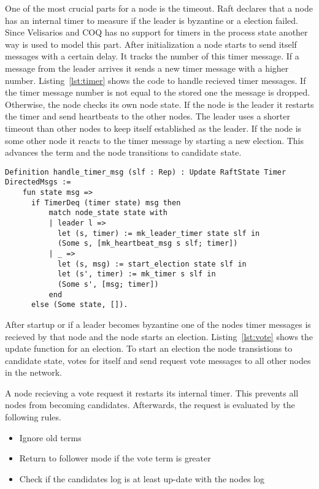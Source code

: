 One of the most crucial parts for a node is the timeout.
Raft declares that a node has an internal timer to measure
if the leader is byzantine or a election failed. 
Since Velisarios and COQ has no support
for timers in the process state another way is used to model this part.
After initialization a node starts to send itself messages with a
certain delay. It tracks the number of this timer message.
If a message from the leader arrives it sends a new timer
message with a higher number. Listing~\ref{lst:timer} shows
the code to handle recieved timer messages. If the timer message
number is not equal to the stored one the message is dropped.
Otherwise, the node checks its own node state.
If the node is the leader it restarts the timer and send heartbeats
to the other nodes. The leader uses a shorter timeout than other nodes
to keep itself established as the leader.
If the node is some other node it reacts to the timer message by
starting a new election. This advances the term and the node 
transitions to candidate state.

\begin{lstlisting}[style=coq,label=lst:timer,
caption=The implementation of handling timer messages.]
  Definition handle_timer_msg (slf : Rep) : Update RaftState Timer DirectedMsgs :=
    fun state msg =>
      if TimerDeq (timer state) msg then
          match node_state state with
          | leader l =>
            let (s, timer) := mk_leader_timer state slf in
            (Some s, [mk_heartbeat_msg s slf; timer])
          | _ =>
            let (s, msg) := start_election state slf in
            let (s', timer) := mk_timer s slf in
            (Some s', [msg; timer])
          end
      else (Some state, []).
\end{lstlisting}

After startup or if a leader becomes byzantine one of the nodes timer messages
is recieved by that node and the node starts an election.
Listing~\ref{lst:vote} shows the update function for an election.
To start an election the node transistions to candidate state, votes for
itself and send request vote messages to all other nodes in the network.

A node recieving a vote request it restarts its internal timer. This prevents
all nodes from becoming candidates. Afterwards, the request is evaluated by the
following rules.
\begin{itemize}
  \item Ignore old terms
  \item Return to follower mode if the vote term is greater
  \item Check if the candidates log is at least up-date with the nodes log
\end{itemize}


